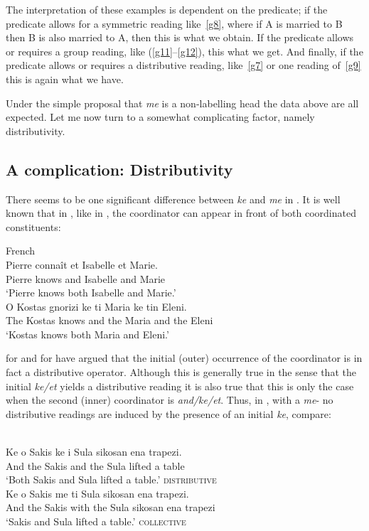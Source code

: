 \documentclass[output=paper]{langsci/langscibook}
\begin{document}
The interpretation of these examples is dependent on the predicate; if the
predicate allows for a symmetric reading like~\eqref{g8}, where if A is married
to B then B is also married to A, then this is what we obtain. If the predicate
allows or requires a group reading, like (\ref{g11}--\ref{g12}), this what we
get. And finally, if the predicate allows or requires a distributive reading,
like~\eqref{g7} or one reading of~\eqref{g9} this is again what we have.

Under the simple proposal that \emph{me} is a non-labelling head the data above
are all expected. Let me now turn to a somewhat complicating factor, namely
distributivity.

\subsection{A complication: Distributivity} \label{distro}

There seems to be one significant difference between \emph{ke} and \emph{me} in
. It is well known that in , like in , the
coordinator can appear in front of both coordinated constituents:

\ea\label{ex:29.40} French\\
    \gll    Pierre conna\^it et Isabelle et Marie.\\
            Pierre knows and Isabelle and Marie\\
    \glt    \enquote*{Pierre knows both Isabelle and Marie.}
\pagebreak\ex\label{ex:29.41} \\
	\gll    O Kostas gnorizi ke ti Maria ke tin Eleni.\\
            The Kostas knows and the Maria and the Eleni\\
    \glt    \enquote*{Kostas knows both Maria and Eleni.}
\z\largerpage

\citet[146, fn.\ 16]{Kayne1994} for  and \citet{cms:15} for  have
argued that the initial (outer) occurrence of the coordinator is in fact a
distributive operator. Although this is generally true in the sense that the
initial \emph{ke/et} yields a distributive reading it is also true that this is
only the case when the second (inner) coordinator is \emph{and/ke/et}. Thus,
in , with a \emph{me}- no distributive readings are induced by
the presence of an initial \emph{ke}, compare:

\ea\label{ex:29.42} \\
	\gll    Ke o Sakis ke i Sula sikosan ena trapezi.\\
            And the Sakis and the Sula lifted a table\\
    \glt    \enquote*{Both Sakis and Sula lifted a table.} \hfill \textsc{distributive}
\ex\label{ex:29.43} \\
	\gll    Ke o Sakis me ti Sula sikosan ena trapezi.\\
            And the Sakis with the Sula sikosan ena trapezi\\
    \glt    \enquote*{Sakis and Sula lifted a table.} \hfill \textsc{collective}
\z
\end{document}

